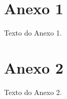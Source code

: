 \chapter{Anexo 1}
\label{Anexo1}

Texto do Anexo 1.

\chapter{Anexo 2}
\label{Anexo2}

Texto do Anexo 2.



